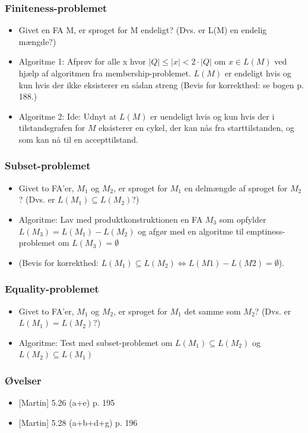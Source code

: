 \begin{frame}
  \frametitle{Finiteness-problemet}
  \begin{itemize}[<+->]
  \item Givet en FA M, er sproget for M endeligt?  
    (Dvs. er L(M) en endelig mængde?) 
  \item
    Algoritme 1: 
    Afprøv for alle x hvor $|Q| \leq |x| < 2\cdot |Q|$ om $x\in L(M)$ ved  
    hjælp af algoritmen fra membership-problemet.
    $L(M)$ er endeligt hvis og kun hvis der ikke eksisterer en  
    sådan streng 
    (Bevis for korrekthed: se bogen p. 188.)
  \item 
    Algoritme 2: Ide: Udnyt at $L(M)$ er uendeligt hvis og kun hvis der i
    tilstandsgrafen for $M$ eksisterer en cykel, der kan nås fra
    starttilstanden, og som kan nå til en accepttilstand.
  \end{itemize}
\end{frame}

\begin{frame}
\frametitle{Subset-problemet}
\begin{itemize}[<+->]
\item Givet to FA’er, $M_1$ og $M_2$, er sproget for $M_1$ en delmængde  
af sproget for $M_2$? (Dvs. er $L(M_1)\subseteq L(M_2)$?) 
\item Algoritme: 
Lav med produktkonstruktionen en FA $M_3$ som opfylder  
$L(M_3) = L(M_1) - L(M_2)$ og afgør med en algoritme til  
emptiness-problemet om $L(M_3)=\emptyset$ 
\item (Bevis for korrekthed:  $L(M_1)\subseteq L(M_2)  \Leftrightarrow  L(M1) - L(M2) = \emptyset$).
\end{itemize}
\end{frame}

\begin{frame}
\frametitle{Equality-problemet}
\begin{itemize}[<+->]
\item Givet to FA’er, $M_1$ og $M_2$, er sproget for $M_1$ det samme som $M_2$? (Dvs. er $L(M_1)=L(M_2)$?) 
\item Algoritme:
  Test med subset-problemet om $L(M_1) \subseteq L(M_2)$ og $L(M_2) \subseteq L(M_1)$
\end{itemize}
\end{frame}

\begin{frame}
\frametitle{Øvelser}
\begin{itemize}[<+->]
\item{}  [Martin] 5.26 (a+e)  p. 195
\item{}  [Martin] 5.28 (a+b+d+g) p. 196
\end{itemize}
\end{frame}

